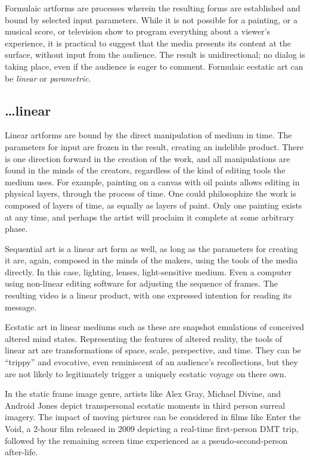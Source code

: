 \documentclass{UIdahoMastersThesis}
\begin{document}
Formulaic artforms are processes wherein the resulting forms are established and bound by selected input parameters. While it is not possible for a painting, or a musical score, or television show to program everything about a viewer's experience, it is practical to suggest that the media presents its content at the surface, without input from the audience. The result is unidirectional; no dialog is taking place, even if the audience is eager to comment.
Formulaic ecstatic art can be \emph{linear} or \emph{parametric}.

\subsection*{\ldots linear}

Linear artforms are bound by the direct manipulation of medium in time. The parameters for input are frozen in the result, creating an indelible product. There is one direction forward in the creation of the work, and all manipulations are found in the minds of the creators, regardless of the kind of editing tools the medium uses. For example, painting on a canvas with oil paints allows editing in physical layers, through the process of time. One could philosophize the work is composed of layers of time, as equally as layers of paint. Only one painting exists at any time, and perhaps the artist will proclaim it complete at some arbitrary phase. 

Sequential art is a linear art form as well, as long as the parameters for creating it are, again, composed in the minds of the makers, using the tools of the media directly. In this case, lighting, lenses, light-sensitive medium. Even a computer using non-linear editing software for adjusting the sequence of frames. The resulting video is a linear product, with one expressed intention for reading its message.

Ecstatic art in linear mediums such as these are snapshot emulations of conceived altered mind states. Representing the features of altered reality, the tools of linear art are transformations of space, scale, perspective, and time. They can be ``trippy'' and evocative, even reminiscent of an audience's recollections, but they are not likely to legitimately trigger a uniquely ecstatic voyage on there own.  

In the static frame image genre, artists like Alex Gray, Michael Divine, and Android Jones depict transpersonal ecstatic moments in third person surreal imagery. The impact of moving pictures can be considered in films like Enter the Void, a 2-hour film released in 2009 depicting a real-time first-person DMT trip, followed by the remaining screen time experienced as a pseudo-second-person after-life.
\end{document}
